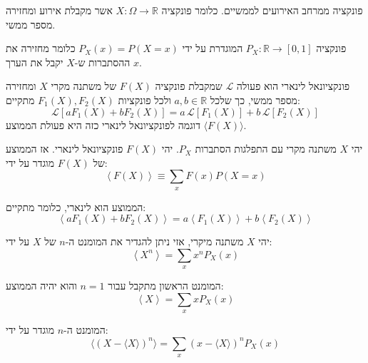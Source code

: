 \documentclass{tstextbook}
\begin{document}
\begin{definition}
פונקציה ממרחב האירועים לממשיים. כלומר פונקציה \(X:\Omega\to \mathbb{R}\) אשר מקבלת אירוע ומחזירה מספר ממשי.

\end{definition}
\begin{definition}
פונקציה \(P_{X}:\mathbb{R}\to [0,1]\) המוגדרת על ידי \(P_{X}(x)=P(X=x)\) כלומר מחזירה את ההסתברות ש-\(X\) יקבל את הערך \(x\).

\end{definition}
\begin{definition}
פונקציונאל לינארי הוא פעולה \(\mathcal{L}\) שמקבלת פונקציה \(F(X)\) של משתנה מקרי \(X\) ומחזירה מספר ממשי, כך שלכל \(a,b\in\mathbb{R}\) ולכל פונקציות \(F_1(X),F_2(X)\) מתקיים:
$$\mathcal{L}\left[a F_1(X) + b F_2(X)\right] = a\,\mathcal{L}\left[F_1(X)\right] + b\,\mathcal{L}\left[F_2(X)\right]
$$
דוגמה לפונקציונאל לינארי כזה היא פעולת הממוצע \(\langle F(X)\rangle\).

\end{definition}
\begin{definition}
יהי \(X\) משתנה מקרי  עם התפלגות הסתברות \(P_{X}\). יהי \(F(X)\) פונקציונאל לינארי. אז הממוצע של \(F(X)\) מוגדר על ידי:
$$\left\langle F\left(X\right)\right\rangle\equiv\sum_{x}F\left(x\right)P\left(X=x\right)$$

\end{definition}
\begin{proposition}
הממוצע הוא לינארי, כלומר מתקיים:
$$\left\langle a F_{1}\left(X\right)+b F_{2}\left(X\right)\right\rangle=a\left\langle F_{1}\left(X\right)\right\rangle+b\left\langle F_{2}\left(X\right)\right\rangle$$

\end{proposition}
\begin{definition}[מומנט]
יהי \(X\) משתנה מיקרי, אזי ניתן להגדיר את המומנט ה-\(n\) של \(X\) על ידי:
$$\left\langle X^{n}\right\rangle=\sum_{x}x^{n}P_{X}\left(x\right)$$

\end{definition}
\begin{example}
המומנט הראשון מתקבל עבור \(n=1\) והוא יהיה הממוצע:
$$\left\langle X\right\rangle=\sum_{x}x P_{X}\left(x\right)$$

\end{example}
\begin{definition}
המומנט ה-\(n\) מוגדר על ידי:
$$\langle(X-\langle X\rangle)^{n}\rangle=\sum_{x}\left(x-\langle X\rangle\right)^{n}P_{X}\left(x\right)$$

\end{definition}
\end{document}
